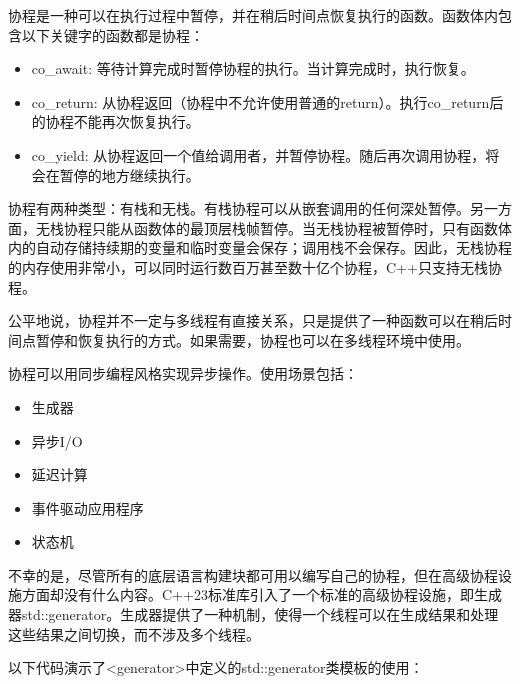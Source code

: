 协程是一种可以在执行过程中暂停，并在稍后时间点恢复执行的函数。函数体内包含以下关键字的函数都是协程：

\begin{itemize}
\item
co\_await: 等待计算完成时暂停协程的执行。当计算完成时，执行恢复。

\item
co\_return: 从协程返回（协程中不允许使用普通的return）。执行co\_return后的协程不能再次恢复执行。

\item
co\_yield: 从协程返回一个值给调用者，并暂停协程。随后再次调用协程，将会在暂停的地方继续执行。
\end{itemize}

协程有两种类型：有栈和无栈。有栈协程可以从嵌套调用的任何深处暂停。另一方面，无栈协程只能从函数体的最顶层栈帧暂停。当无栈协程被暂停时，只有函数体内的自动存储持续期的变量和临时变量会保存；调用栈不会保存。因此，无栈协程的内存使用非常小，可以同时运行数百万甚至数十亿个协程，C++只支持无栈协程。

公平地说，协程并不一定与多线程有直接关系，只是提供了一种函数可以在稍后时间点暂停和恢复执行的方式。如果需要，协程也可以在多线程环境中使用。

协程可以用同步编程风格实现异步操作。使用场景包括：

\begin{itemize}
\item
生成器

\item
异步I/O

\item
延迟计算

\item
事件驱动应用程序

\item
状态机
\end{itemize}


不幸的是，尽管所有的底层语言构建块都可用以编写自己的协程，但在高级协程设施方面却没有什么内容。C++23标准库引入了一个标准的高级协程设施，即生成器std::generator。生成器提供了一种机制，使得一个线程可以在生成结果和处理这些结果之间切换，而不涉及多个线程。

以下代码演示了<generator>中定义的std::generator类模板的使用：


